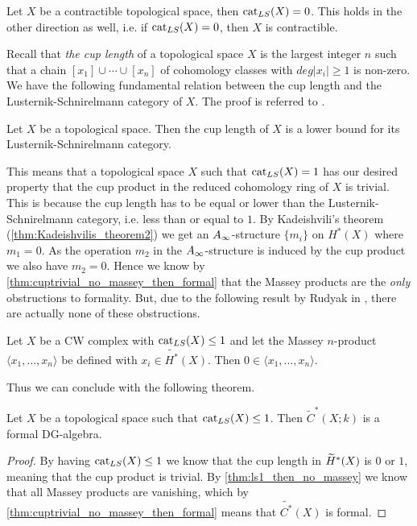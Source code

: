 \begin{example}
Let $X$ be a contractible topological space, then $\text{cat}_{LS}(X)=0$. This holds in the other direction as well, i.e. if $\text{cat}_{LS}(X)=0$, then $X$ is contractible.
\end{example}

Recall that \emph{the cup length} of a topological space $X$ is the largest integer $n$ such that a chain $[x_1]\cup \cdots \cup [x_n]$ of cohomology classes with $deg|x_i|\geq 1$ is non-zero. We have the following fundamental relation between the cup length and the Lusternik-Schnirelmann category of $X$. The proof is referred to \cite{lscategorybook}.

\begin{lemma}
\label{lem:cup-length_lower_bound}
Let $X$ be a topological space. Then the cup length of $X$ is a lower bound for its Lusternik-Schnirelmann category. 
\end{lemma}

This means that a topological space $X$ such that $\text{cat}_{LS}(X)=1$ has our desired property that the cup product in the reduced cohomology ring of $X$ is trivial. This is because the cup length has to be equal or lower than the Lusternik-Schnirelmann category, i.e. less than or equal to $1$. By Kadeishvili's theorem (\cref{thm:Kadeishvilis_theorem2}) we get an $A_{\infty}$-structure $\{m_i\}$ on $H^*(X)$ where $m_1 =0$. As the operation $m_2$ in the $A_{\infty}$-structure is induced by the cup product we also have $m_2=0$. Hence we know by \ref{thm:cuptrivial_no_massey_then_formal} that the Massey products are the \emph{only} obstructions to formality. But, due to the following result by Rudyak in \cite[Lemma 4.6]{Rudyak}, there are actually none of these obstructions. 

\begin{theorem}
\label{thm:ls1_then_no_massey}
Let $X$ be a CW complex with $\text{cat}_{LS}(X)\leq 1$ and let the Massey $n$-product $\langle x_1, \ldots, x_n\rangle$ be defined with $x_i \in \widetilde{H^*}(X)$. Then $0\in \langle x_1, \ldots, x_n\rangle $.
\end{theorem}

Thus we can conclude with the following theorem. 

\begin{theorem}
\label{thm:ls1_then_reduced_formal}
Let $X$ be a topological space such that $\text{cat}_{LS}(X)\leq 1$. Then $\widetilde{C}^*(X;k)$ is a formal DG-algebra.
\end{theorem}
\begin{proof}
By having $\text{cat}_{LS}(X)\leq 1$ we know that the cup length in $\widetilde{H}^*(X)$ is $0$ or $1$, meaning that the cup product is trivial. By \cref{thm:ls1_then_no_massey} we know that all Massey products are vanishing, which by  \cref{thm:cuptrivial_no_massey_then_formal} means that $\widetilde{C^*}(X)$ is formal.
\end{proof}


